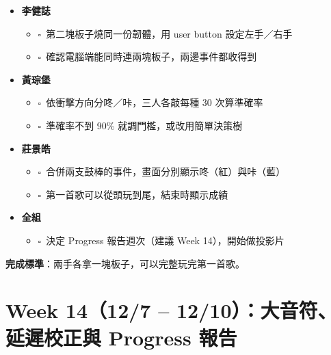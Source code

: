 \documentclass[11pt]{article}
\newcommand{\todo}{$\square$\ }
\newcommand{\who}[1]{\textbf{#1}}
\begin{document}
\begin{itemize}[label={}]
  \item \who{李健誌}
  \begin{itemize}[label={}]
    \item \todo 第二塊板子燒同一份韌體，用 user button 設定左手／右手
    \item \todo 確認電腦端能同時連兩塊板子，兩邊事件都收得到
  \end{itemize}
  \item \who{黃琮堡}
  \begin{itemize}[label={}]
    \item \todo 依衝擊方向分咚／咔，三人各敲每種 30 次算準確率
    \item \todo 準確率不到 90\% 就調門檻，或改用簡單決策樹
  \end{itemize}
  \item \who{莊景皓}
  \begin{itemize}[label={}]
    \item \todo 合併兩支鼓棒的事件，畫面分別顯示咚（紅）與咔（藍）
    \item \todo 第一首歌可以從頭玩到尾，結束時顯示成績
  \end{itemize}
  \item \who{全組}
  \begin{itemize}[label={}]
    \item \todo 決定 Progress 報告週次（建議 Week 14），開始做投影片
  \end{itemize}
\end{itemize}
\textbf{完成標準}：兩手各拿一塊板子，可以完整玩完第一首歌。

\section*{Week 14（12/7 -- 12/10）：大音符、延遲校正與 Progress 報告}
\end{document}
